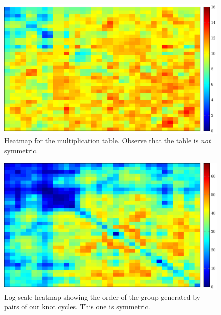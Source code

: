 \begin{landscape}
  \begin{figure}[H]
    \centering
    \includegraphics{figures/unknotting-moves-and-combinatorial-representations/mult-heatmap.pdf}
    \caption[Heatmap of Multiplication Table]{Heatmap for the
      multiplication table. Observe that the table is \emph{not}
      symmetric.}
    \label{tab:mult-heatmap}
  \end{figure}
\end{landscape}

\begin{landscape}
  \begin{figure}[H]
    \centering
    \includegraphics{figures/unknotting-moves-and-combinatorial-representations/po-heatmap.pdf}
    \caption[Heatmap of Pairwise Group Orders]{Log-scale heatmap
      showing the order of the group generated by pairs of our knot
      cycles. This one is symmetric.}
    \label{tab:po-heatmap}
  \end{figure}
\end{landscape}

